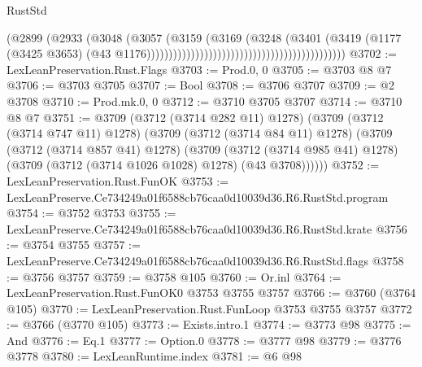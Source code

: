 \begin{lexlean}{RustStd}
\begin{coremodule}
                                                                        (@2899
                                                                          (@2933
                                                                            (@3048
                                                                              (@3057
                                                                                (@3159
                                                                                  (@3169
                                                                                    (@3248
                                                                                      (@3401
                                                                                        (@3419
                                                                                          (@1177
                                                                                            (@3425
                                                                                              @3653)
                                                                                            (@43
                                                                                              @1176)))))))))))))))))))))))))))))))))))))))))))))
@3702 := LexLeanPreservation.Rust.Flags
@3703 := Prod.{0, 0}
@3705 := @3703 @8 @7
@3706 := @3703 @3705
@3707 := Bool
@3708 := @3706 @3707
@3709 := @2 @3708
@3710 := Prod.mk.{0, 0}
@3712 := @3710 @3705 @3707
@3714 := @3710 @8 @7
@3751 := @3709
    (@3712 (@3714 @282 @11) @1278)
    (@3709
      (@3712 (@3714 @747 @11) @1278)
      (@3709
        (@3712 (@3714 @84 @11) @1278)
        (@3709
          (@3712 (@3714 @857 @41) @1278)
          (@3709
            (@3712 (@3714 @985 @41) @1278)
            (@3709 (@3712 (@3714 @1026 @1028) @1278) (@43 @3708))))))
@3752 := LexLeanPreservation.Rust.FunOK
@3753 := LexLeanPreserve.Ce734249a01f6588cb76caa0d10039d36.R6.RustStd.program
@3754 := @3752 @3753
@3755 := LexLeanPreserve.Ce734249a01f6588cb76caa0d10039d36.R6.RustStd.krate
@3756 := @3754 @3755
@3757 := LexLeanPreserve.Ce734249a01f6588cb76caa0d10039d36.R6.RustStd.flags
@3758 := @3756 @3757
@3759 := @3758 @105
@3760 := Or.inl
@3764 := LexLeanPreservation.Rust.FunOK0 @3753 @3755 @3757
@3766 := @3760 (@3764 @105)
@3770 := LexLeanPreservation.Rust.FunLoop @3753 @3755 @3757
@3772 := @3766 (@3770 @105)
@3773 := Exists.intro.{1}
@3774 := @3773 @98
@3775 := And
@3776 := Eq.{1}
@3777 := Option.{0}
@3778 := @3777 @98
@3779 := @3776 @3778
@3780 := LexLeanRuntime.index
@3781 := @6 @98

\end{coremodule}
\end{lexlean}
